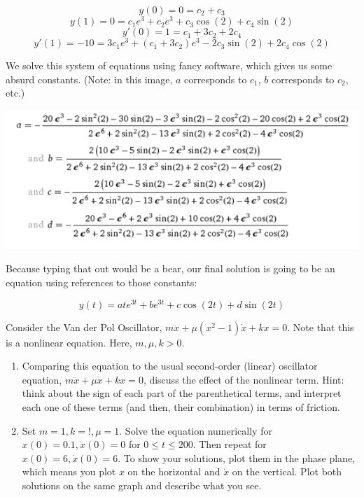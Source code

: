 \documentclass[11pt,answers]{exam}
\begin{document}
\begin{questions}
\begin{solution}
\[
y(0) = 0 = c_{2} + c_{3}
\]
\[
y(1) = 0 = c_{1}e^{3} + c_{2}e^{3} + c_{3}\cos{(2)} + c_{4}\sin{(2)}
\]
\[
y'(0) = 1 = c_{1} + 3c_{2} + 2c_{4}
\]
\[
y'(1) = -10 = 3 c_{1} e^{3} + (c_{1} + 3c_{2})e^{3} - 2 c_{3}\sin{(2)} + 2c_{4}\cos{(2)}
\]

We solve this system of equations using fancy software, which gives us some absurd constants. (Note: in this image, $a$ corresponds to $c_{1}$, $b$ corresponds to $c_{2}$, etc.)

\begin{center}
\includegraphics{constants.png}
\end{center}

Because typing that out would be a bear, our final solution is going to be an equation using references to those constants:

\begin{equation}
y(t) = a t e^{3t} + be^{3t} + c\cos{(2t)} + d\sin{(2t)}
\end{equation}

\end{solution}

\item Consider the Van der Pol Oscillator, $m\ddot{x} + \mu(x^2 - 1)\dot{x} + kx = 0$.  Note that this is a nonlinear equation.  Here, $m, \mu, k > 0$.
\begin{enumerate}
\item Comparing this equation to the usual second-order (linear) oscillator equation, $m\ddot{x} + \mu\dot{x} + kx = 0$, discuss the effect of the nonlinear term.  Hint: think about the sign of each part of the parenthetical  terms, and interpret each one of these terms (and then, their combination) in terms of friction.
\item Set $m = 1, k = !, \mu = 1$.  Solve the equation numerically for $x(0) = 0.1, \dot{x}(0) = 0$ for $0 \leq t \leq 200$.  Then repeat for $x(0) = 6, \dot{x}(0) = 6$.  To show your solutions, plot them in the phase plane, which means you plot $x$ on the horizontal and $\dot{x}$ on the vertical.  Plot both solutions on the same graph and describe what you see.
\end{enumerate}


\end{questions}
\end{document}
